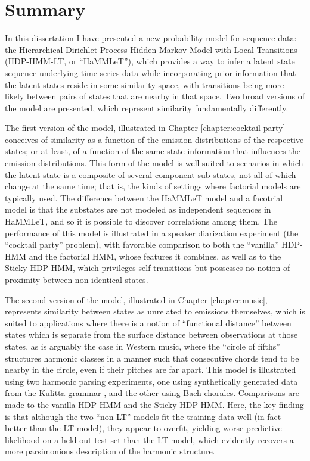 
\section{Summary}
\label{sec:summary}

In this dissertation I have presented a new probability model for sequence data: the Hierarchical Dirichlet Process Hidden Markov Model with Local Transitions (HDP-HMM-LT, or ``HaMMLeT''), which provides a way to infer a latent state sequence underlying time series data while incorporating prior information that the latent states reside in some similarity space, with transitions being more likely between pairs of states that are nearby in that space.  Two broad versions of the model are presented, which represent similarity fundamentally differently.  

The first version of the model, illustrated in Chapter \ref{chapter:cocktail-party} conceives of similarity as a function of the emission distributions of the respective states; or at least, of a function of the same state information that influences the emission distributions.  This form of the model is well suited to scenarios in which the latent state is a composite of several component sub-states, not all of which change at the same time; that is, the kinds of settings where factorial models are typically used.  The difference between the HaMMLeT model and a facotrial model is that the substates are not modeled as independent sequences in HaMMLeT, and so it is possible to discover correlations among them.  The performance of this model is illustrated in a speaker diarization experiment (the ``cocktail party'' problem), with favorable comparison to both the ``vanilla'' HDP-HMM and the factorial HMM, whose features it combines, as well as to the Sticky HDP-HMM, which privileges self-transitions but possesses no notion of proximity between non-identical states.

The second version of the model, illustrated in Chapter \ref{chapter:music}, represents similarity between states as unrelated to emissions themselves, which is suited to applications where there is a notion of ``functional distance'' between states which is separate from the surface distance between observations at those states, as is arguably the case in Western music, where the ``circle of fifths'' structures harmonic classes in a manner such that consecutive chords tend to be nearby in the circle, even if their pitches are far apart.  This model is illustrated using two harmonic parsing experiments, one using synthetically generated data from the Kulitta grammar \cite{quick2014kulitta}, and the other using Bach chorales.  Comparisons are made to the vanilla HDP-HMM and the Sticky HDP-HMM.  Here, the key finding is that although the two ``non-LT'' models fit the training data well (in fact better than the LT model), they appear to overfit, yielding worse predictive likelihood on a held out test set than the LT model, which evidently recovers a more parsimonious description of the harmonic structure.

